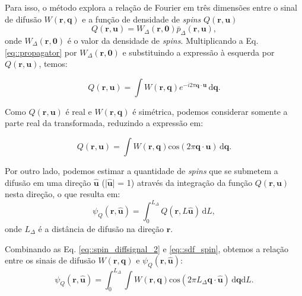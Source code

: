 \documentclass[
    12pt,                %
    oneside,            %
    a4paper,            %
    english,            %
    french,                %
    spanish,            %
    brazil                %
    ]{abntex2}
\begin{document}
Para isso, o método explora a relação de Fourier em três dimensões entre o sinal de difusão $W(\mathbf{r}, \mathbf{q})$ e a função de densidade de \textit{spins} $Q(\mathbf{r}, \mathbf{u})$
\begin{equation}
\label{eq::spin_densidade_presentacao}
    Q(\mathbf{r}, \mathbf{u}) = W_{\Delta}(\mathbf{r}, \mathbf{0}) \bar{p}_{\Delta}(\mathbf{r}, \mathbf{u}),
\end{equation}
onde $W_{\Delta}(\mathbf{r}, \mathbf{0})$ é o valor da densidade de \textit{spins}. Multiplicando a Eq. \ref{eq::propagator} por  $W_{\Delta}(\mathbf{r}, \mathbf{0})$ e substituindo a expressão à esquerda por $Q(\mathbf{r}, \mathbf{u})$, temos:


\begin{equation}
\label{eq::spin_diffsignal_1}
    Q(\mathbf{r}, \mathbf{u}) =
    \int \! W(\mathbf{r}, \mathbf{q})e^{-i2\pi \mathbf{q}\cdot \mathbf{u} } \,\mathrm{d}\mathbf{q} .
\end{equation}

Como $Q(\mathbf{r}, \mathbf{u})$ é real e $W(\mathbf{r}, \mathbf{q})$ é simétrica, podemos considerar somente a parte real da transformada, reduzindo a expressão em:

\begin{equation}
\label{eq::spin_diffsignal_2}
    Q(\mathbf{r}, \mathbf{u}) =
     \int \! W(\mathbf{r}, \mathbf{q})\text{cos}(2\pi \mathbf{q}\cdot \mathbf{u}) \,\mathrm{d}\mathbf{q} .
\end{equation}

Por outro lado, podemos estimar a quantidade de \textit{spins} que se submetem a difusão em uma direção $\mathbf{\hat{u}}$ (|$\mathbf{\hat{u}}$| = 1) através da integração da função $Q(\mathbf{r}, \mathbf{u})$ nesta direção, o que resulta em:
\begin{equation}
\label{eq::sdf_spin}
    \psi_Q(\mathbf{r}, \mathbf{\hat{u}}) =
   \int_{0}^{L_{\Delta}} Q(\mathbf{r}, L\mathbf{\hat{u}})\!  \,\mathrm{d}L , 
\end{equation}
onde $L_\Delta$ é a distância de difusão na direção  $\mathbf{r}$.

Combinando as Eq. \ref{eq::spin_diffsignal_2} e \ref{eq::sdf_spin}, obtemos a relação entre os sinais de difusão $W(\mathbf{r}, \mathbf{q})$ e $\psi_Q(\mathbf{r}, \mathbf{\hat{u}})$:
\begin{equation}
\label{eq::sdf_continuous_1}
    \psi_Q(\mathbf{r}, \mathbf{\hat{u}}) =
    \int_{0}^{L_{\Delta}}\int \! W(\mathbf{r}, \mathbf{q}) \text{cos}(2\pi L_{\Delta} \mathbf{q} \cdot \mathbf{\hat{u}}) \,\mathrm{d}\mathbf{q} \mathrm{d}L .
\end{equation}
\end{document}
